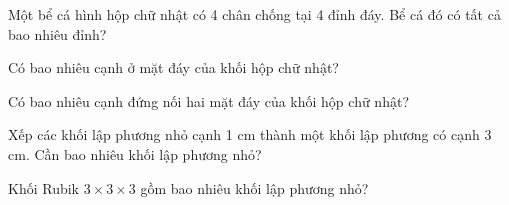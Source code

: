 \begin{ex}
Một bể cá hình hộp chữ nhật có 4 chân chống tại 4 đỉnh đáy. Bể cá đó có tất cả bao nhiêu đỉnh?
\end{ex}

\begin{ex}
Có bao nhiêu cạnh ở mặt đáy của khối hộp chữ nhật?
\end{ex}

\begin{ex}
Có bao nhiêu cạnh đứng nối hai mặt đáy của khối hộp chữ nhật?
\end{ex}

\begin{ex}
Xếp các khối lập phương nhỏ cạnh 1 cm thành một khối lập phương có cạnh 3 cm. Cần bao nhiêu khối lập phương nhỏ?
\end{ex}

\begin{ex}
Khối Rubik $3 \times 3 \times 3$ gồm bao nhiêu khối lập phương nhỏ?
\end{ex}
